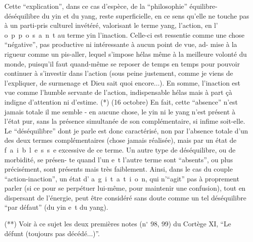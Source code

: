 Cette ``explication'', dans ce cas d'espèce, de la ``philosophie'' équilibre-
déséquilibre du yin et du yang, reste superficielle, en ce sens qu'elle ne
touche pas à un parti-pris culturel invétéré, valorisant le terme yang, l'action,
en l' \mbox{o p p o s a n t} au terme yin\inserted{,} l'inaction. Celle-ci est ressentie comme
une chose ``négative'', pas productive ni intéressante à aucun point de vue, ad-
mise à la rigueur comme un pis-aller, lequel s'impose hélas même à la meilleure
volonté du monde, puisqu'il faut quand-même se reposer de temps en temps pour
pouvoir continuer à s'investir dans l'action (sous peine justement, comme je
viens de l'expliquer, de surmenage et Dieu sait quoi encore...). En somme,
l'inaction est vue comme l'humble servante de l'action, indispensable hélas mais
à part çà indigne d'attention ni d'estime.
(*) (16 octobre) En fait, cette ``absence'' n'est jamais totale il me semble -
en aucune chose, le yin ni le yang n'est présent à l'état pur, sans la présence
simultanée de son complémentaire, si infime soit-elle. Le ``déséquilibre'' dont
je parle est donc caractérisé, non par l'absence totale d'un des deux termes
complémentaires (chose jamais réalisée), mais par un état de \mbox{f a i b l e s s e}
excessive de ce terme. Un autre type de déséquilibre, ou de morbidité, se présen-
te quand l'un \mbox{e t} l'autre terme sont ``absents'', ou plus précisément, sont
présents mais très faiblement. Ainsi, dans le cas du couple ``action-inaction'',
un état d' \mbox{a g i t a t i o n}, qui n'``agit'' pas à proprement parler (si ce 
pour se perpétuer lui-même, pour maintenir une confusion), tout en dispersant de
l'énergie, peut être considéré sans doute comme un tel déséquilibre ``par défaut''
(du yin \mbox{e t} du yang).

(**) Voir à ce sujet les deux premières notes (n$^\circ$ 98, 99) du Cortège XI, ``Le
défunt (toujours pas décédé...)''.
\margin{-}

